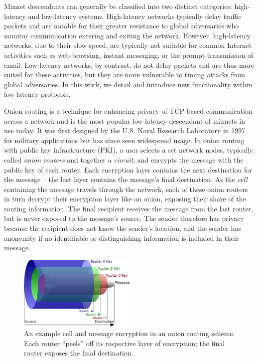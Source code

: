 Mixnet descendants can generally be classified into two distinct categories: high-latency and low-latency systems. High-latency networks typically delay traffic packets and are notable for their greater resistance to global adversaries who monitor communication entering and exiting the network. However, high-latency networks, due to their slow speed, are typically not suitable for common Internet activities such as web browsing, instant messaging, or the prompt transmission of email. Low-latency networks, by contrast, do not delay packets and are thus more suited for these activities, but they are more vulnerable to timing attacks from global adversaries\cite{dingledine2004tor}. In this work, we detail and introduce new functionality within low-latency protocols.

Onion routing is a technique for enhancing privacy of TCP-based communication across a network and is the most popular low-latency descendant of mixnets in use today. It was first designed by the U.S. Naval Research Laboratory in 1997 for military applications\cite{syverson1997anonymous}\cite{reed1998anonymous} but has since seen widespread usage. In onion routing with public key infrastructure (PKI), a user selects a set network nodes, typically called \emph{onion routers} and together a \emph{circuit}, and encrypts the message with the public key of each router. Each encryption layer contains the next destination for the message -- the last layer contains the message's final destination. As the \emph{cell} containing the message travels through the network, each of these onion routers in turn decrypt their encryption layer like an onion, exposing their share of the routing information. The final recipient receives the message from the last router, but is never exposed to the message's source\cite{syverson2011peel}. The sender therefore has privacy because the recipient does not know the sender's location, and the sender has anonymity if no identifiable or distinguishing information is included in their message.

\begin{figure}[htbp]
	\centering
	\includegraphics[width=0.5\textwidth]{images/onion-diagram.eps}
	\caption{An example cell and message encryption in an onion routing scheme. Each router ``peels'' off its respective layer of encryption; the final router exposes the final destination.}
\end{figure}


